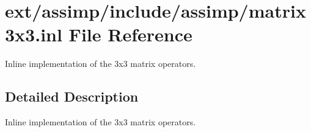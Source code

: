 \hypertarget{matrix3x3_8inl}{\section{ext/assimp/include/assimp/matrix3x3.inl File Reference}
\label{matrix3x3_8inl}
}


Inline implementation of the 3x3 matrix operators.  




\subsection{Detailed Description}
Inline implementation of the 3x3 matrix operators. 